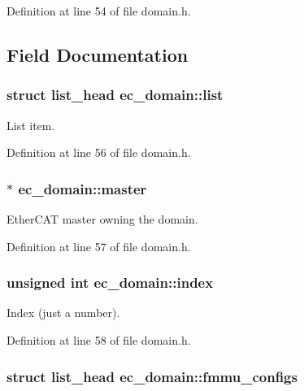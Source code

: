 \-Definition at line 54 of file domain.\-h.



\subsection{\-Field \-Documentation}
\subsubsection[{list}]{\setlength{\rightskip}{0pt plus 5cm}struct list\-\_\-head {\bf ec\-\_\-domain\-::list}}\label{structec__domain_a2d15a4d54c3c1893bd3902d43380d474}


\-List item. 



\-Definition at line 56 of file domain.\-h.

\subsubsection[{master}]{$\ast$ {\bf ec\-\_\-domain\-::master}}\label{structec__domain_a58e4f4b7d54f30e58c7187268c1525c1}


\-Ether\-C\-A\-T master owning the domain. 



\-Definition at line 57 of file domain.\-h.

\subsubsection[{index}]{\setlength{\rightskip}{0pt plus 5cm}unsigned int {\bf ec\-\_\-domain\-::index}}\label{structec__domain_ac341000021b5790693cc74f7687fb956}


\-Index (just a number). 



\-Definition at line 58 of file domain.\-h.

\subsubsection[{fmmu\-\_\-configs}]{\setlength{\rightskip}{0pt plus 5cm}struct list\-\_\-head {\bf ec\-\_\-domain\-::fmmu\-\_\-configs}}\label{structec__domain_af7578fbb9d9c493a4c086b5c9cc3796b}


